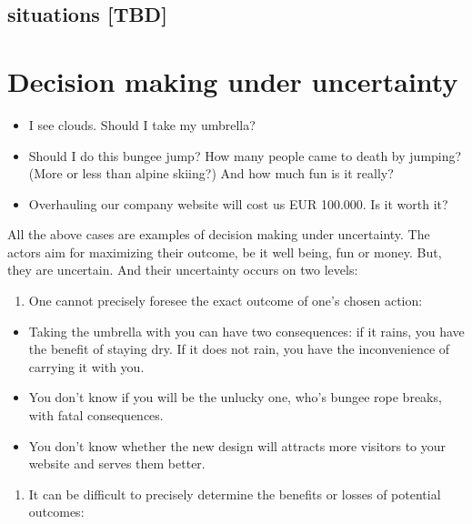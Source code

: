 \documentclass[]{svmono}
\providecommand{\tightlist}{%
  \setlength{\itemsep}{0pt}\setlength{\parskip}{0pt}}
\begin{document}
\subsection{situations {[}TBD{]}}\label{situations-tbd}

\section{Decision making under uncertainty}\label{decision_making}

\begin{itemize}
\tightlist
\item
  I see clouds. Should I take my umbrella?
\item
  Should I do this bungee jump? How many people came to death by
  jumping? (More or less than alpine skiing?) And how much fun is it
  really?
\item
  Overhauling our company website will cost us EUR 100.000. Is it worth
  it?
\end{itemize}

All the above cases are examples of decision making under uncertainty.
The actors aim for maximizing their outcome, be it well being, fun or
money. But, they are uncertain. And their uncertainty occurs on two
levels:

\begin{enumerate}
\def\labelenumi{\arabic{enumi}.}
\tightlist
\item
  One cannot precisely foresee the exact outcome of one's chosen action:
\end{enumerate}

\begin{itemize}
\tightlist
\item
  Taking the umbrella with you can have two consequences: if it rains,
  you have the benefit of staying dry. If it does not rain, you have the
  inconvenience of carrying it with you.
\item
  You don't know if you will be the unlucky one, who's bungee rope
  breaks, with fatal consequences.
\item
  You don't know whether the new design will attracts more visitors to
  your website and serves them better.
\end{itemize}

\begin{enumerate}
\def\labelenumi{\arabic{enumi}.}
\setcounter{enumi}{1}
\tightlist
\item
  It can be difficult to precisely determine the benefits or losses of
  potential outcomes:
\end{enumerate}
\end{document}
